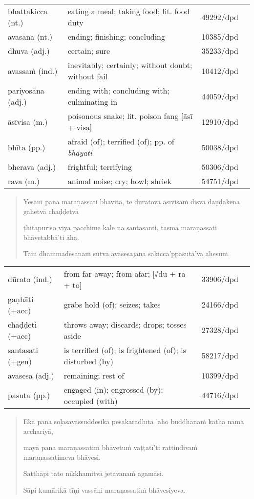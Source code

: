 \documentclass[11pt,oneside]{memoir}
\begin{document}
\begin{longtable}{L{\colOne} L{\colTwo} H H}
bhattakicca (nt.) & eating a meal; taking food; lit. food duty & 49292/dpd & \\[0pt]
avasāna (nt.) & ending; finishing; concluding & 10385/dpd & \\[0pt]
dhuva (adj.) & certain; sure & 35233/dpd & \\[0pt]
avassaṁ (ind.) & inevitably; certainly; without doubt; without fail & 10412/dpd & \\[0pt]
pariyosāna (adj.) & ending with; concluding with; culminating in & 44059/dpd & \\[0pt]
āsīvisa (m.) & poisonous snake; lit. poison fang [āsī + visa] & 12910/dpd & \\[0pt]
bhīta (pp.) & afraid (of); terrified (of); pp. of \emph{bhāyati} & 50038/dpd & \\[0pt]
bherava (adj.) & frightful; terrifying & 50306/dpd & \\[0pt]
rava (m.) & animal noise; cry; howl; shriek & 54751/dpd & \\[0pt]
\end{longtable}

\begin{quote}
Yesaṁ pana maraṇassati bhāvitā, te dūratova āsīvisaṁ disvā daṇḍakena gahetvā chaḍḍetvā

ṭhitapuriso viya pacchime kāle na santasanti, tasmā maraṇassati bhāvetabbā'ti āha.

Taṁ dhammadesanaṁ sutvā avasesajanā sakicca'ppasutā'va ahesuṁ.
\end{quote}

\begin{longtable}{L{\colOne} L{\colTwo} H H}
dūrato (ind.) & from far away; from afar;  [√dū + ra + to] & 33906/dpd & \\[0pt]
gaṇhāti (+acc) & grabs hold (of); seizes; takes & 24166/dpd & \\[0pt]
chaḍḍeti (+acc) & throws away; discards; drops; tosses aside & 27328/dpd & \\[0pt]
santasati (+gen) & is terrified (of); is frightened (of); is disturbed (by) & 58217/dpd & \\[0pt]
avasesa (adj.) & remaining; rest of & 10399/dpd & \\[0pt]
pasuta (pp.) & engaged (in); engrossed (by); occupied (with) & 44716/dpd & \\[0pt]
\end{longtable}

\begin{quote}
Ekā pana soḷasavassuddesikā pesakāradhītā 'aho buddhānaṁ kathā nāma acchariyā,

mayā pana maraṇassatiṁ bhāvetuṁ vaṭṭatī'ti rattindivaṁ maraṇassatimeva bhāvesi.

Satthāpi tato nikkhamitvā jetavanaṁ agamāsi.

Sāpi kumārikā tīṇi vassāni maraṇassatiṁ bhāvesiyeva.
\end{quote}
\end{document}
